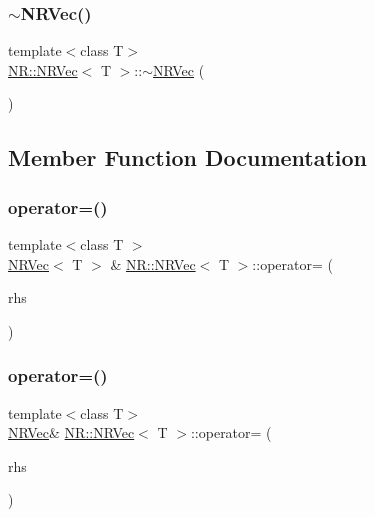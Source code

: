 \mbox{\label{classNR_1_1NRVec_a7161dfe4a95a73eca56d084c662f8eae}} 
\subsubsection{\texorpdfstring{$\sim$NRVec()}{~NRVec()}\hspace{0.1cm}{\footnotesize\ttfamily [3/3]}}
{\footnotesize\ttfamily template$<$class T$>$ \\
\mbox{\hyperlink{classNR_1_1NRVec}{N\+R\+::\+N\+R\+Vec}}$<$ T $>$\+::$\sim$\mbox{\hyperlink{classNR_1_1NRVec}{N\+R\+Vec}} (\begin{DoxyParamCaption}{ }\end{DoxyParamCaption})}



\subsection{Member Function Documentation}
\mbox{\label{classNR_1_1NRVec_a7a84b82248fd96b304123602029e0ef1}} 
\subsubsection{\texorpdfstring{operator=()}{operator=()}\hspace{0.1cm}{\footnotesize\ttfamily [1/6]}}
{\footnotesize\ttfamily template$<$class T $>$ \\
\mbox{\hyperlink{classNR_1_1NRVec}{N\+R\+Vec}}$<$ T $>$ \& \mbox{\hyperlink{classNR_1_1NRVec}{N\+R\+::\+N\+R\+Vec}}$<$ T $>$\+::operator= (\begin{DoxyParamCaption}\item[{const \mbox{\hyperlink{classNR_1_1NRVec}{N\+R\+Vec}}$<$ T $>$ \&}]{rhs }\end{DoxyParamCaption})}

\mbox{\label{classNR_1_1NRVec_a29999391ce59d89db129830e58ddf6ef}} 
\subsubsection{\texorpdfstring{operator=()}{operator=()}\hspace{0.1cm}{\footnotesize\ttfamily [2/6]}}
{\footnotesize\ttfamily template$<$class T$>$ \\
\mbox{\hyperlink{classNR_1_1NRVec}{N\+R\+Vec}}\& \mbox{\hyperlink{classNR_1_1NRVec}{N\+R\+::\+N\+R\+Vec}}$<$ T $>$\+::operator= (\begin{DoxyParamCaption}\item[{const \mbox{\hyperlink{classNR_1_1NRVec}{N\+R\+Vec}}$<$ T $>$ \&}]{rhs }\end{DoxyParamCaption})}

